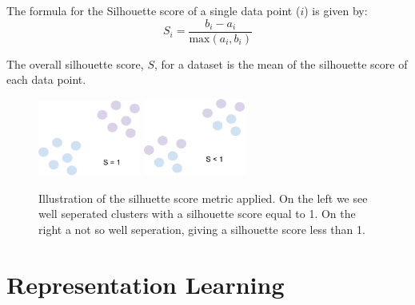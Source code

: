The formula for the Silhouette score of a single data point ($i$) is given by:
\begin{equation}
    S_i = \frac{b_i-a_i}{\text{max}(a_i, b_i)}
\end{equation}

The overall silhouette score, $S$, for a dataset is the mean of the silhouette score of each data point.
\begin{figure}[H]
    \centering
    \includegraphics[width=0.3\textwidth]{figures/figure-pdf/Shigh.pdf}
    \hspace{1cm}
    \includegraphics[width=0.3\textwidth]{figures/figure-pdf/Slow.pdf}
    \caption{Illustration of the silhuette score metric applied. On the left we see well seperated clusters with a silhouette score equal to 1. On the right a not so well seperation, giving a silhouette score less than 1.}
    \label{fig:knn}
\end{figure}

\section{Representation Learning}
